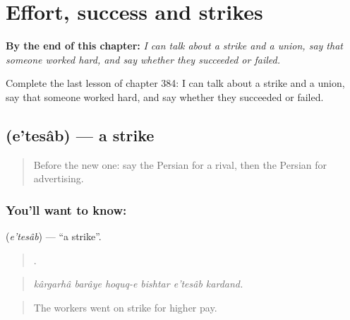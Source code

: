 
\chapter{Effort, success and strikes}
\label{ch:fa-effort-success-and-strikes}

\begin{chapteropening}
\textbf{By the end of this chapter:} \emph{I can talk about a strike and a union, say that someone worked hard, and say whether they succeeded or failed.}

Complete the last lesson of chapter 384: I can talk about a strike and a union, say that someone worked hard, and say whether they succeeded or failed.
\end{chapteropening}

\section[\texorpdfstring{\fa{اعتصاب} (e'tesâb)}{اعتصاب (e'tesâb)}]{ (e'tesâb) — a strike}

\label{lesson:FA-C384-etesab}



\begin{quote}
Before the new one: say the Persian for a rival, then the Persian for advertising.
\end{quote}

\subsection*{You'll want to know: }
\textbf{} (\emph{e'tesâb}) — \textquotedblleft{}a strike\textquotedblright{}.

\begin{quote}
     .
\end{quote}

\begin{quote}
\emph{kârgarhâ barâye hoquq-e bishtar e'tesâb kardand.}
\end{quote}

\begin{quote}
The workers went on strike for higher pay.
\end{quote}

